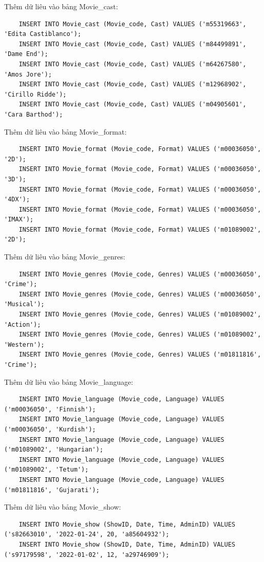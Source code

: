 Thêm dữ liêu vào bảng Movie\_cast:
\begin{verbatim}
    INSERT INTO Movie_cast (Movie_code, Cast) VALUES ('m55319663', 'Edita Castiblanco');
    INSERT INTO Movie_cast (Movie_code, Cast) VALUES ('m84499891', 'Dame End');
    INSERT INTO Movie_cast (Movie_code, Cast) VALUES ('m64267580', 'Amos Jore');
    INSERT INTO Movie_cast (Movie_code, Cast) VALUES ('m12968902', 'Cirillo Ridde');
    INSERT INTO Movie_cast (Movie_code, Cast) VALUES ('m04905601', 'Cara Barthod');
\end{verbatim}
Thêm dữ liêu vào bảng Movie\_format:
\begin{verbatim}
    INSERT INTO Movie_format (Movie_code, Format) VALUES ('m00036050', '2D');
    INSERT INTO Movie_format (Movie_code, Format) VALUES ('m00036050', '3D');
    INSERT INTO Movie_format (Movie_code, Format) VALUES ('m00036050', '4DX');
    INSERT INTO Movie_format (Movie_code, Format) VALUES ('m00036050', 'IMAX');
    INSERT INTO Movie_format (Movie_code, Format) VALUES ('m01089002', '2D');
\end{verbatim}

Thêm dữ liêu vào bảng Movie\_genres:
\begin{verbatim}
    INSERT INTO Movie_genres (Movie_code, Genres) VALUES ('m00036050', 'Crime');
    INSERT INTO Movie_genres (Movie_code, Genres) VALUES ('m00036050', 'Musical');
    INSERT INTO Movie_genres (Movie_code, Genres) VALUES ('m01089002', 'Action');
    INSERT INTO Movie_genres (Movie_code, Genres) VALUES ('m01089002', 'Western');
    INSERT INTO Movie_genres (Movie_code, Genres) VALUES ('m01811816', 'Crime');
\end{verbatim}

Thêm dữ liêu vào bảng Movie\_language:
\begin{verbatim}
    INSERT INTO Movie_language (Movie_code, Language) VALUES ('m00036050', 'Finnish');
    INSERT INTO Movie_language (Movie_code, Language) VALUES ('m00036050', 'Kurdish');
    INSERT INTO Movie_language (Movie_code, Language) VALUES ('m01089002', 'Hungarian');
    INSERT INTO Movie_language (Movie_code, Language) VALUES ('m01089002', 'Tetum');
    INSERT INTO Movie_language (Movie_code, Language) VALUES ('m01811816', 'Gujarati');
\end{verbatim}

Thêm dữ liêu vào bảng Movie\_show:
\begin{verbatim}
    INSERT INTO Movie_show (ShowID, Date, Time, AdminID) VALUES ('s82663010', '2022-01-24', 20, 'a85604932');
    INSERT INTO Movie_show (ShowID, Date, Time, AdminID) VALUES ('s97179598', '2022-01-02', 12, 'a29746909');
\end{verbatim}

